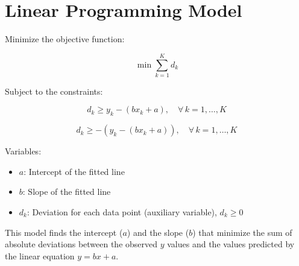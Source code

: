 \documentclass{article}
\begin{document}
\section*{Linear Programming Model}

Minimize the objective function:

\[
\min \sum_{k=1}^{K} d_k
\]

Subject to the constraints:

\[
d_k \geq y_k - (bx_k + a), \quad \forall\, k = 1, \ldots, K
\]

\[
d_k \geq -(y_k - (bx_k + a)), \quad \forall\, k = 1, \ldots, K
\]

Variables:
\begin{itemize}
    \item \( a \): Intercept of the fitted line
    \item \( b \): Slope of the fitted line
    \item \( d_k \): Deviation for each data point (auxiliary variable), \( d_k \geq 0 \)
\end{itemize}

This model finds the intercept (\( a \)) and the slope (\( b \)) that minimize the sum of absolute deviations between the observed \( y \) values and the values predicted by the linear equation \( y = bx + a \).
\end{document}
